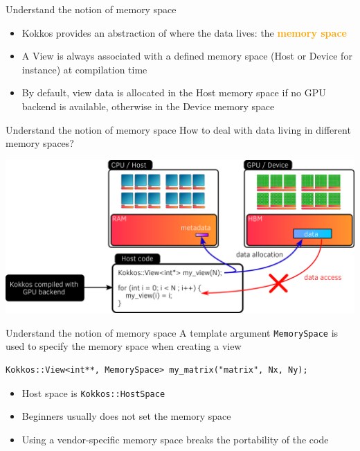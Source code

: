 \documentclass[aspectratio=169]{beamer}
\newcommand{\highlight}[1]{\textcolor{orange}{\textbf{#1}}}
\begin{document}
\begin{frame}{Understand the notion of memory space}
    \begin{itemize}
        \item Kokkos provides an abstraction of where the data lives: the \highlight{memory space}
        \item A View is always associated with a defined memory space (Host or Device for instance) at compilation time
        \item By default, view data is allocated in the Host memory space if no GPU backend is available, otherwise in the Device memory space
    \end{itemize}
\end{frame}


\begin{frame}{Understand the notion of memory space}
     How to deal with data living in different memory spaces?

    \begin{center}
        \includegraphics[width=\textwidth]{device_memory_access.png}
    \end{center}

\end{frame}


\begin{frame}[fragile]{Understand the notion of memory space}
    A template argument \texttt{MemorySpace} is used to specify the memory space when creating a view

    \begin{verbatim}
Kokkos::View<int**, MemorySpace> my_matrix("matrix", Nx, Ny);
    \end{verbatim}
    \begin{itemize}
        \item Host space is \texttt{Kokkos::HostSpace}
        \item Beginners usually does not set the memory space
        \item Using a vendor-specific memory space breaks the portability of the code
    \end{itemize}
\end{frame}
\end{document}
